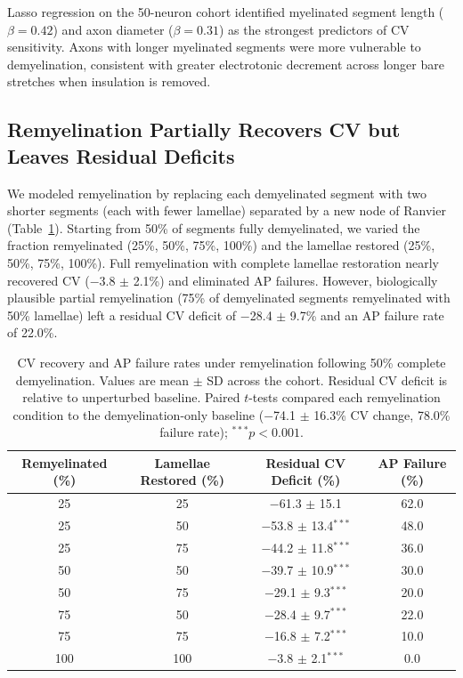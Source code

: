 \documentclass[11pt]{article}
\begin{document}
Lasso regression on the 50-neuron cohort identified myelinated segment length ($\beta = 0.42$) and axon diameter ($\beta = 0.31$) as the strongest predictors of CV sensitivity. Axons with longer myelinated segments were more vulnerable to demyelination, consistent with greater electrotonic decrement across longer bare stretches when insulation is removed.

\subsection{Remyelination Partially Recovers CV but Leaves Residual Deficits}

We modeled remyelination by replacing each demyelinated segment with two shorter segments (each with fewer lamellae) separated by a new node of Ranvier (Table~\ref{tab:remyelination}). Starting from 50\% of segments fully demyelinated, we varied the fraction remyelinated (25\%, 50\%, 75\%, 100\%) and the lamellae restored (25\%, 50\%, 75\%, 100\%). Full remyelination with complete lamellae restoration nearly recovered CV ($-$3.8 $\pm$ 2.1\%) and eliminated AP failures. However, biologically plausible partial remyelination (75\% of demyelinated segments remyelinated with 50\% lamellae) left a residual CV deficit of $-$28.4 $\pm$ 9.7\% and an AP failure rate of 22.0\%.

\begin{table}[H]
\centering
\caption{CV recovery and AP failure rates under remyelination following 50\% complete demyelination. Values are mean $\pm$ SD across the cohort. Residual CV deficit is relative to unperturbed baseline. Paired $t$-tests compared each remyelination condition to the demyelination-only baseline ($-$74.1 $\pm$ 16.3\% CV change, 78.0\% failure rate); $^{\ast\ast\ast}p<0.001$.}
\label{tab:remyelination}
\begin{tabular}{cccc}
\toprule
\textbf{Remyelinated (\%)} & \textbf{Lamellae Restored (\%)} & \textbf{Residual CV Deficit (\%)} & \textbf{AP Failure (\%)} \\
\midrule
25 & 25 & $-$61.3 $\pm$ 15.1 & 62.0 \\
25 & 50 & $-$53.8 $\pm$ 13.4$^{\ast\ast\ast}$ & 48.0 \\
25 & 75 & $-$44.2 $\pm$ 11.8$^{\ast\ast\ast}$ & 36.0 \\
50 & 50 & $-$39.7 $\pm$ 10.9$^{\ast\ast\ast}$ & 30.0 \\
50 & 75 & $-$29.1 $\pm$ 9.3$^{\ast\ast\ast}$ & 20.0 \\
75 & 50 & $-$28.4 $\pm$ 9.7$^{\ast\ast\ast}$ & 22.0 \\
75 & 75 & $-$16.8 $\pm$ 7.2$^{\ast\ast\ast}$ & 10.0 \\
100 & 100 & $-$3.8 $\pm$ 2.1$^{\ast\ast\ast}$ & 0.0 \\
\bottomrule
\end{tabular}
\end{table}
\end{document}
